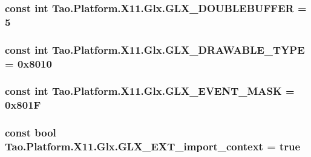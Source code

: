 \label{class_tao_1_1_platform_1_1_x11_1_1_glx_a11cda7d73face7eabc20e12fb7d990a1}
\hypertarget{class_tao_1_1_platform_1_1_x11_1_1_glx_a76cfa4610aa8f6c72e50aa96b9d2ba38}{
\subsubsection[{GLX\_\-DOUBLEBUFFER}]{\setlength{\rightskip}{0pt plus 5cm}const int {\bf Tao.Platform.X11.Glx.GLX\_\-DOUBLEBUFFER} = 5}}
\label{class_tao_1_1_platform_1_1_x11_1_1_glx_a76cfa4610aa8f6c72e50aa96b9d2ba38}
\hypertarget{class_tao_1_1_platform_1_1_x11_1_1_glx_abd580356fe0bc30ae3eb7d3fd85b66a0}{
\subsubsection[{GLX\_\-DRAWABLE\_\-TYPE}]{\setlength{\rightskip}{0pt plus 5cm}const int {\bf Tao.Platform.X11.Glx.GLX\_\-DRAWABLE\_\-TYPE} = 0x8010}}
\label{class_tao_1_1_platform_1_1_x11_1_1_glx_abd580356fe0bc30ae3eb7d3fd85b66a0}
\hypertarget{class_tao_1_1_platform_1_1_x11_1_1_glx_a1a6cc2a5122e3ab70b2af77556b04c5a}{
\subsubsection[{GLX\_\-EVENT\_\-MASK}]{\setlength{\rightskip}{0pt plus 5cm}const int {\bf Tao.Platform.X11.Glx.GLX\_\-EVENT\_\-MASK} = 0x801F}}
\label{class_tao_1_1_platform_1_1_x11_1_1_glx_a1a6cc2a5122e3ab70b2af77556b04c5a}
\hypertarget{class_tao_1_1_platform_1_1_x11_1_1_glx_abec2a3b7c5910903cdfca72d15e02d22}{
\subsubsection[{GLX\_\-EXT\_\-import\_\-context}]{\setlength{\rightskip}{0pt plus 5cm}const bool {\bf Tao.Platform.X11.Glx.GLX\_\-EXT\_\-import\_\-context} = true}}
